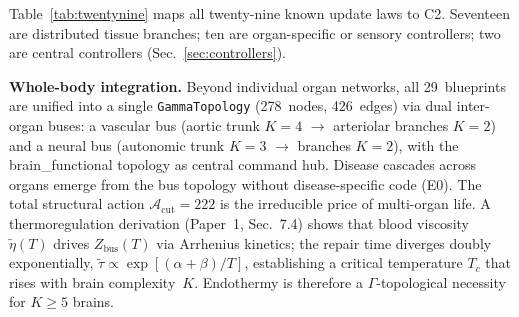 \documentclass[aps,pre,twocolumn,superscriptaddress,floatfix]{revtex4-2}
\begin{document}
Table~\ref{tab:twentynine} maps all twenty-nine known
update laws to C2.  Seventeen are distributed
tissue branches; ten are organ-specific or sensory
controllers; two are central controllers
(Sec.~\ref{sec:controllers}).

\textbf{Whole-body integration.}  Beyond individual organ
networks, all 29~blueprints are unified into a single
\texttt{GammaTopology} (278~nodes, 426~edges) via dual
inter-organ buses: a vascular bus (aortic trunk $K{=}4$
$\to$ arteriolar branches $K{=}2$) and a neural bus
(autonomic trunk $K{=}3$ $\to$ branches $K{=}2$), with
the brain\_functional topology as central command hub.
Disease cascades across organs emerge from the bus
topology without disease-specific code (E0).
The total structural action
$\mathcal{A}_{\text{cut}} = 222$ is the
irreducible price of multi-organ life.
A thermoregulation derivation (Paper~1, Sec.~7.4)
shows that blood viscosity $\tilde\eta(T)$ drives
$Z_{\text{bus}}(T)$ via Arrhenius kinetics;
the repair time diverges doubly exponentially,
$\tilde\tau \propto \exp[(\alpha+\beta)/T]$,
establishing a critical temperature $T_c$
that rises with brain complexity~$K$.
Endothermy is therefore a $\Gamma$-topological
necessity for $K \geq 5$ brains.
\end{document}
